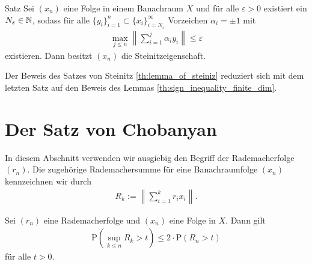 \begin{genericthm}{Satz}\label{th:sufficent_condition_steiniz_prop}
	Sei $ (x_n) $ eine Folge in einem Banachraum $ X $ und
	für alle $ \varepsilon >0 $ existiert ein $ N_\varepsilon \in \mathbb{N} $,
	sodass für alle $ \{y_i\}_{i = 1}^n \subset \{x_i\}_{i = N_\varepsilon}^\infty $ Vorzeichen $ \alpha_i = \pm 1 $ mit
	\begin{align*}
		\max \limits_{j \leq n}
		\left\|
		\sum \limits_{i = 1}^j \alpha_i y_i
		\right\|
		\leq \varepsilon
	\end{align*}
	existieren.
	Dann besitzt $ (x_n) $ die Steinitzeigenschaft.
\end{genericthm}
Der Beweis des Satzes von Steinitz \ref{th:lemma_of_steiniz} reduziert sich mit dem letzten Satz auf den Beweis des Lemmas \ref{th:sign_inequality_finite_dim}. 











\section{Der Satz von Chobanyan}\label{sc:lemma_of_chobanyan}
In diesem Abschnitt verwenden wir ausgiebig den Begriff der Rademacherfolge $ (r_n) $.
Die zugehörige Rademachersumme für eine Banachraumfolge $ (x_n) $ kennzeichnen wir durch
\begin{align*}
	R_k := 
	\left\|
	\sum \limits_{i = 1}^k r_i x_i \right\|.
\end{align*}



\begin{lem}
	Sei $ (r_n) $ eine Rademacherfolge und $ (x_n) $ eine Folge in $ X $.
	Dann gilt
	\begin{align}\label{eq:proab_boundary}
		\mathrm{P}
		\left(
		\sup \limits_{k \leq n } R_k > t
		\right)
		\leq 2 \cdot
		 \mathrm{P}(R_n > t)
	\end{align}
	für alle $ t > 0 $.
\end{lem}

